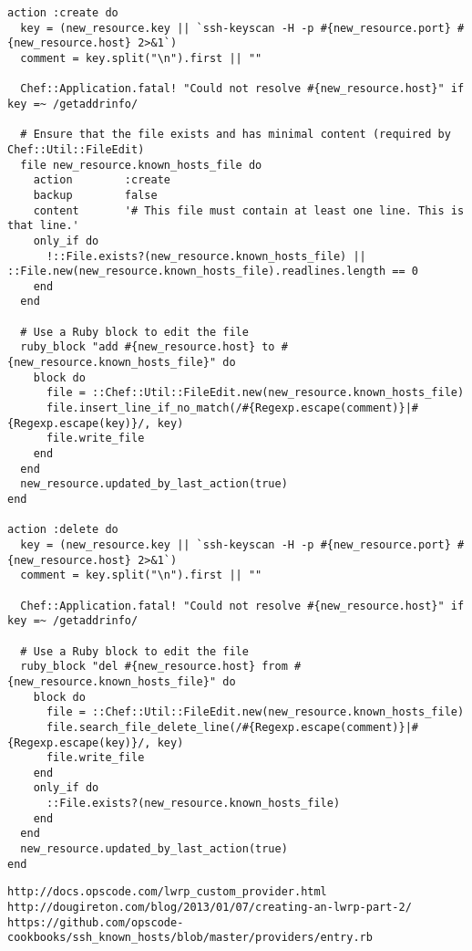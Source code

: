 \begin{lstlisting}[label=lst:cookbook-lwrp3,title=my-server-cloud/site-cookbooks/my\_cool\_app/providers/know\_host.rb]
action :create do
  key = (new_resource.key || `ssh-keyscan -H -p #{new_resource.port} #{new_resource.host} 2>&1`)
  comment = key.split("\n").first || ""

  Chef::Application.fatal! "Could not resolve #{new_resource.host}" if key =~ /getaddrinfo/

  # Ensure that the file exists and has minimal content (required by Chef::Util::FileEdit)
  file new_resource.known_hosts_file do
    action        :create
    backup        false
    content       '# This file must contain at least one line. This is that line.'
    only_if do
      !::File.exists?(new_resource.known_hosts_file) || ::File.new(new_resource.known_hosts_file).readlines.length == 0
    end
  end

  # Use a Ruby block to edit the file
  ruby_block "add #{new_resource.host} to #{new_resource.known_hosts_file}" do
    block do
      file = ::Chef::Util::FileEdit.new(new_resource.known_hosts_file)
      file.insert_line_if_no_match(/#{Regexp.escape(comment)}|#{Regexp.escape(key)}/, key)
      file.write_file
    end
  end
  new_resource.updated_by_last_action(true)
end

action :delete do
  key = (new_resource.key || `ssh-keyscan -H -p #{new_resource.port} #{new_resource.host} 2>&1`)
  comment = key.split("\n").first || ""

  Chef::Application.fatal! "Could not resolve #{new_resource.host}" if key =~ /getaddrinfo/

  # Use a Ruby block to edit the file
  ruby_block "del #{new_resource.host} from #{new_resource.known_hosts_file}" do
    block do
      file = ::Chef::Util::FileEdit.new(new_resource.known_hosts_file)
      file.search_file_delete_line(/#{Regexp.escape(comment)}|#{Regexp.escape(key)}/, key)
      file.write_file
    end
    only_if do
      ::File.exists?(new_resource.known_hosts_file)
    end
  end
  new_resource.updated_by_last_action(true)
end
\end{lstlisting}

\begin{lstlisting}
http://docs.opscode.com/lwrp_custom_provider.html
http://dougireton.com/blog/2013/01/07/creating-an-lwrp-part-2/
https://github.com/opscode-cookbooks/ssh_known_hosts/blob/master/providers/entry.rb
\end{lstlisting}